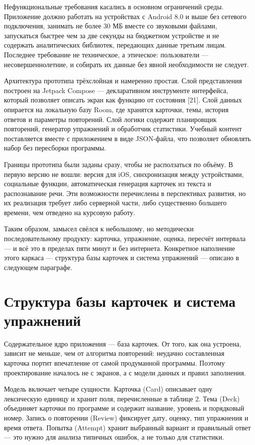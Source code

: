 \documentclass[11pt,a4paper,openany]{report}
\begin{document}
Нефункциональные требования касались в основном ограничений среды. Приложение должно работать на устройствах с Android 8.0 и выше без сетевого подключения, занимать не более 30 МБ вместе со звуковыми файлами, запускаться быстрее чем за две секунды на бюджетном устройстве и не содержать аналитических библиотек, передающих данные третьим лицам. Последнее требование не техническое, а этическое: пользователи — несовершеннолетние, и собирать их данные без явной необходимости не следует.

Архитектура прототипа трёхслойная и намеренно простая. Слой представления построен на Jetpack Compose — декларативном инструменте интерфейса, который позволяет описать экран как функцию от состояния [21]. Слой данных опирается на локальную базу Room, где хранятся карточки, темы, история ответов и параметры повторений. Слой логики содержит планировщик повторений, генератор упражнений и обработчик статистики. Учебный контент поставляется вместе с приложением в виде JSON-файла, что позволяет обновлять набор без пересборки программы.

Границы прототипа были заданы сразу, чтобы не расползаться по объёму. В первую версию не вошли: версия для iOS, синхронизация между устройствами, социальные функции, автоматическая генерация карточек из текста и распознавание речи. Эти возможности перечислены в перспективах развития, но их реализация требует либо серверной части, либо существенно большего времени, чем отведено на курсовую работу.

Таким образом, замысел свёлся к небольшому, но методически последовательному продукту: карточка, упражнение, оценка, пересчёт интервала — и всё это в пределах пяти минут и без интернета. Конкретное наполнение этого каркаса — структура базы карточек и система упражнений — описано в следующем параграфе.

\section{Структура базы карточек и система упражнений}

Содержательное ядро приложения — база карточек. От того, как она устроена, зависит не меньше, чем от алгоритма повторений: неудачно составленная карточка портит впечатление от самой продуманной программы. Поэтому проектирование началось не с экранов, а с модели данных и правил заполнения.

Модель включает четыре сущности. Карточка (Card) описывает одну лексическую единицу и хранит поля, перечисленные в таблице 2. Тема (Deck) объединяет карточки по программе и содержит название, уровень и порядковый номер. Запись о повторении (Review) фиксирует дату, оценку, тип упражнения и время ответа. Попытка (Attempt) хранит выбранный вариант и правильный ответ — это нужно для анализа типичных ошибок, а не только для статистики.
\end{document}
